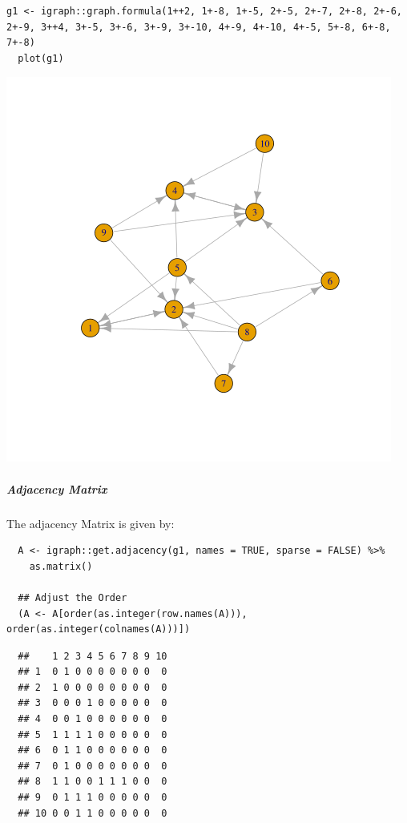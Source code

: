 \documentclass[11pt]{article}
\begin{document}
\begin{verbatim}
g1 <- igraph::graph.formula(1++2, 1+-8, 1+-5, 2+-5, 2+-7, 2+-8, 2+-6, 2+-9, 3++4, 3+-5, 3+-6, 3+-9, 3+-10, 4+-9, 4+-10, 4+-5, 5+-8, 6+-8, 7+-8)
  plot(g1)
\end{verbatim}

\begin{center}
\includegraphics[width=.9\linewidth]{media/example-graph-power-walk.png}
\end{center}


\subparagraph{Adjacency Matrix}
\label{adjacency-matrix}
The adjacency Matrix is given by:

\begin{verbatim}
  A <- igraph::get.adjacency(g1, names = TRUE, sparse = FALSE) %>%
    as.matrix()

  ## Adjust the Order
  (A <- A[order(as.integer(row.names(A))), order(as.integer(colnames(A)))])
\end{verbatim}

\begin{verbatim}
  ##    1 2 3 4 5 6 7 8 9 10
  ## 1  0 1 0 0 0 0 0 0 0  0
  ## 2  1 0 0 0 0 0 0 0 0  0
  ## 3  0 0 0 1 0 0 0 0 0  0
  ## 4  0 0 1 0 0 0 0 0 0  0
  ## 5  1 1 1 1 0 0 0 0 0  0
  ## 6  0 1 1 0 0 0 0 0 0  0
  ## 7  0 1 0 0 0 0 0 0 0  0
  ## 8  1 1 0 0 1 1 1 0 0  0
  ## 9  0 1 1 1 0 0 0 0 0  0
  ## 10 0 0 1 1 0 0 0 0 0  0
\end{verbatim}
\end{document}
